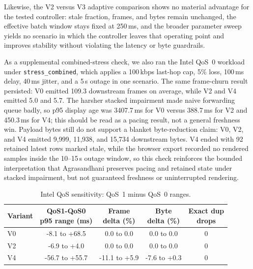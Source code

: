 \documentclass[sigconf,authorversion,nonacm]{acmart}
\begin{document}
Likewise, the V2 versus V3 adaptive comparison shows no material advantage for the tested controller: stale fraction, frames, and bytes remain unchanged, the effective batch window stays fixed at 250\,ms, and the broader parameter sweep yields no scenario in which the controller leaves that operating point and improves stability without violating the latency or byte guardrails.

As a supplemental combined-stress check, we also ran the Intel QoS~0 workload under \texttt{stress\_combined}, which applies a 100\,kbps last-hop cap, 5\% loss, 100\,ms delay, 40\,ms jitter, and a 5\,s outage in one scenario. The same frame-churn result persisted: V0 emitted 109.3 downstream frames on average, while V2 and V4 emitted 5.0 and 5.7. The harsher stacked impairment made naive forwarding queue badly, so p95 display age was 3407.7\,ms for V0 versus 388.7\,ms for V2 and 450.3\,ms for V4; this should be read as a pacing result, not a general freshness win. Payload bytes still do not support a blanket byte-reduction claim: V0, V2, and V4 emitted 9{,}999, 11{,}938, and 15{,}734 downstream bytes. V4 ended with 92 retained latest rows marked stale, while the browser export recorded no rendered samples inside the 10--15\,s outage window, so this check reinforces the bounded interpretation that Agrasandhani preserves pacing and retained state under stacked impairment, but not guaranteed freshness or uninterrupted rendering.

\begin{table}[H]
\centering
\caption{Intel QoS sensitivity: QoS~1 minus QoS~0 ranges.}
\label{tab:intel-qos-delta}
\scriptsize
\setlength{\tabcolsep}{3pt}
\renewcommand{\arraystretch}{0.96}
\begin{adjustbox}{max width=\columnwidth}
\begin{tabular}{@{}lcccc@{}}
\toprule
Variant & \makecell[r]{QoS1-QoS0\\p95 range (ms)} & \makecell[r]{Frame\\delta (\%)} & \makecell[r]{Byte\\delta (\%)} & \makecell[c]{Exact dup\\drops} \\
\midrule
V0 & -8.1 to +68.5 & 0.0 to 0.0 & 0.0 to 0.0 & 0 \\
V2 & -6.9 to +4.0 & 0.0 to 0.0 & 0.0 to 0.0 & 0 \\
V4 & -56.7 to +55.7 & -11.1 to +5.9 & -7.6 to +0.3 & 0 \\
\bottomrule
\end{tabular}
\end{adjustbox}
\end{table}
\end{document}
